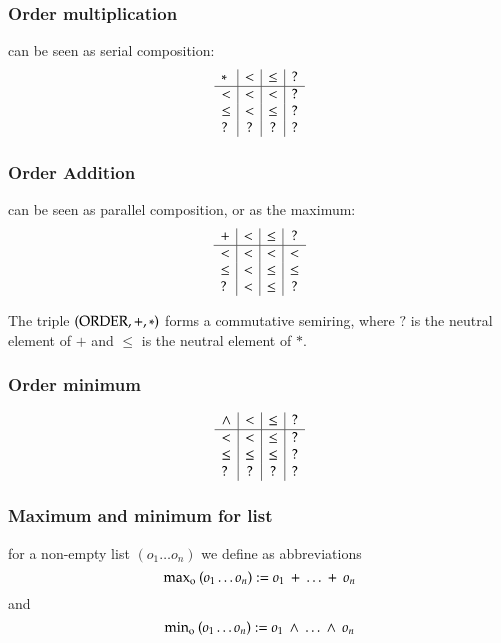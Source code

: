 \subsubsection{Order multiplication}
can be seen as serial composition:
\[
\begin{array}{l | c |c | c}
 *   &  <  &  \leq & ? \\
\hline
  <   & <    & <    &   ? \\
 \leq & <    & \leq &   ?  \\
 ?    & ?    & ?    &   ?
\end{array}
\]

\subsubsection{Order Addition}
can be seen as parallel composition, or as the maximum:
\[
\begin{array}{l | c |c | c }

 +    &  <   &  \leq   &  ? \\
 \hline 
 <    &  <   & <       &  <   \\
 \leq &  <   & \leq    &  \leq \\
 ?    &  <   & \leq    &  ?
\end{array}
\]

The triple $(\operatorname{ORDER},+,*)$ forms a commutative semiring, where $?$  is the neutral element of $+$ and $\leq$ is the neutral element of $*$.

\newcommand{\info}{\opn{min_o}}
\newcommand{\supo}{\opn{max_o}}

\subsubsection{Order minimum}
\[
\begin{array}{l | c |c | c}
\wedge &  <      &  \leq    & ? \\
\hline
  <    & <       &  \leq    &   ? \\
 \leq  & \leq    &  \leq    &   ?  \\
 ?     & ?       &  ?       &   ?
\end{array}
\]



\subsubsection{Maximum and minimum for list}
for a non-empty list $(o_1 \ldots o_n)$ we define as abbreviations
\[\supo \: (o_1 \ldots o_n) := o_1 \: + \: \ldots \: + \: o_n \]
and
\[\info \: (o_1 \ldots o_n) := o_1 \: \wedge \: \ldots \: \wedge \: o_n \]


